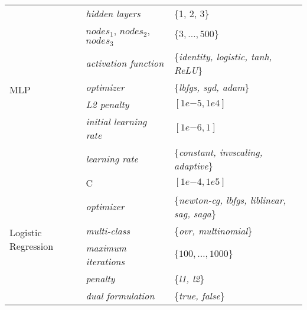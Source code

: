 {\begin{table}[!t]
{\begin{tabular}{p{2.5cm}lp{4.9cm}}
    \multirow{7}{1cm}{MLP} & \textit{hidden layers} & \{1, 2, 3\}\\
    \cline{2-3}
    & $\textit{nodes}_1$, $\textit{nodes}_2$, $\textit{nodes}_3$ & $\{3, \dotsc, 500\}$\\
    \cline{2-3}
    & \textit{activation function} & \{\textit{identity, logistic, tanh, ReLU}\}\\
    \cline{2-3}
    & \textit{optimizer} & \{\textit{lbfgs, sgd, adam}\}\\
    \cline{2-3}
    & \textit{L2 penalty} & $[1e\mathrm{-5}, 1e\mathrm{4}]$\\
    \cline{2-3}
    & \textit{initial learning rate} & $[1e\mathrm{-6}, 1]$\\
    \cline{2-3}
    & \textit{learning rate} & \{\textit{constant, invscaling, adaptive}\}\\
     \hline

    \multirow{6}{*}{Logistic Regression}& C & $[1e\mathrm{-4}, 1e\mathrm{5}]$ \\
    \cline{2-3}
    & \textit{optimizer} & \{\textit{newton-cg, lbfgs, liblinear, sag, saga}\} \\
    \cline{2-3}
    & \textit{multi-class} & \{\textit{ovr, multinomial}\} \\
    \cline{2-3}
    & \textit{maximum iterations} & $\{100, \dotsc, 1000\}$ \\
    \cline{2-3}
    & \textit{penalty} & \{\textit{l1, l2}\} \\
    \cline{2-3}
    & \textit{dual formulation} & \{\textit{true, false}\} \\
    \cline{2-3}
    \hline
    \end{tabular}}
\end{table}
}
